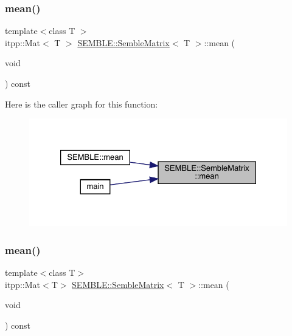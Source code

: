 \subsubsection{\texorpdfstring{mean()}{mean()}\hspace{0.1cm}{\footnotesize\ttfamily [1/2]}}
{\footnotesize\ttfamily template$<$class T $>$ \\
itpp\+::\+Mat$<$ T $>$ \mbox{\hyperlink{structSEMBLE_1_1SembleMatrix}{S\+E\+M\+B\+L\+E\+::\+Semble\+Matrix}}$<$ T $>$\+::mean (\begin{DoxyParamCaption}\item[{void}]{ }\end{DoxyParamCaption}) const}

Here is the caller graph for this function\+:
\nopagebreak
\begin{figure}[H]
\begin{center}
\leavevmode
\includegraphics[width=326pt]{df/d87/structSEMBLE_1_1SembleMatrix_a53a5289f03357a50c6504282100e4237_icgraph}
\end{center}
\end{figure}
\mbox{\label{structSEMBLE_1_1SembleMatrix_a0013e054dd36b47be4616b828c0ef19d}} 
\subsubsection{\texorpdfstring{mean()}{mean()}\hspace{0.1cm}{\footnotesize\ttfamily [2/2]}}
{\footnotesize\ttfamily template$<$class T$>$ \\
itpp\+::\+Mat$<$T$>$ \mbox{\hyperlink{structSEMBLE_1_1SembleMatrix}{S\+E\+M\+B\+L\+E\+::\+Semble\+Matrix}}$<$ T $>$\+::mean (\begin{DoxyParamCaption}\item[{void}]{ }\end{DoxyParamCaption}) const}

